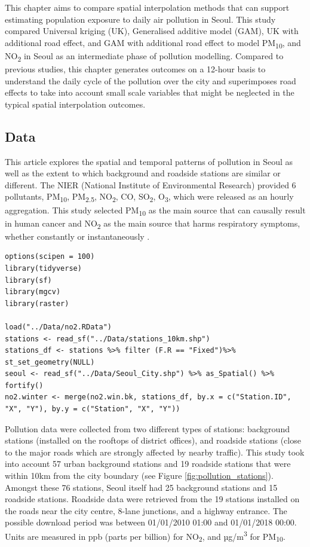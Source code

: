 This chapter aims to compare spatial interpolation methods that can
support estimating population exposure to daily air pollution in Seoul.
This study compared Universal kriging (UK), Generalised additive model
(GAM), UK with additional road effect, and GAM with additional road
effect to model PM\textsubscript{10}, and NO\textsubscript{2} in Seoul
as an intermediate phase of pollution modelling. Compared to previous
studies, this chapter generates outcomes on a 12-hour basis to
understand the daily cycle of the pollution over the city and
superimposes road effects to take into account small scale variables
that might be neglected in the typical spatial interpolation outcomes.

\hypertarget{data}{%
\subsection{Data}\label{data}}

This article explores the spatial and temporal patterns of pollution in
Seoul as well as the extent to which background and roadside stations
are similar or different. The NIER (National Institute of Environmental
Research) provided 6 pollutants, PM\textsubscript{10},
PM\textsubscript{2.5}, NO\textsubscript{2}, CO, SO\textsubscript{2},
O\textsubscript{3}, which were released as an hourly aggregation. This
study selected PM\textsubscript{10} as the main source that can causally
result in human cancer and NO\textsubscript{2} as the main source that
harms respiratory symptoms, whether constantly or instantaneously
\citep{WHO2013}.

\begin{verbatim}
options(scipen = 100)
library(tidyverse)
library(sf)
library(mgcv)
library(raster)

load("../Data/no2.RData")
stations <- read_sf("../Data/stations_10km.shp")
stations_df <- stations %>% filter (F.R == "Fixed")%>% st_set_geometry(NULL)
seoul <- read_sf("../Data/Seoul_City.shp") %>% as_Spatial() %>% fortify()
no2.winter <- merge(no2.win.bk, stations_df, by.x = c("Station.ID", "X", "Y"), by.y = c("Station", "X", "Y"))
\end{verbatim}

Pollution data were collected from two different types of stations:
background stations (installed on the rooftops of district offices), and
roadside stations (close to the major roads which are strongly affected
by nearby traffic). This study took into account 57 urban background
stations and 19 roadside stations that were within 10km from the city
boundary (see Figure \ref{fig:pollution_stations}). Amongst these 76
stations, Seoul itself had 25 background stations and 15 roadside
stations. Roadside data were retrieved from the 19 stations installed on
the roads near the city centre, 8-lane junctions, and a highway
entrance. The possible download period was between 01/01/2010 01:00 and
01/01/2018 00:00. Units are measured in ppb (parts per billion) for
NO\textsubscript{2}, and µg/m\textsuperscript{3} for
PM\textsubscript{10}.

